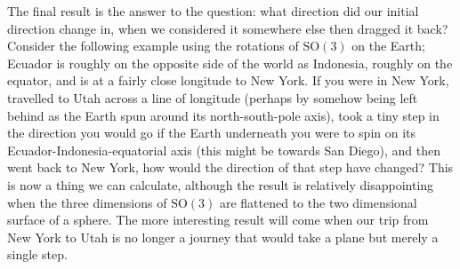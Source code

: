 \documentclass[11pt]{article}
\begin{document}
The final result is the answer to the question: what direction did our initial direction change in, when we considered it somewhere else then dragged it back? Consider the following example using the rotations of $\mathrm{SO(3)}$ on the Earth; Ecuador is roughly on the opposite side of the world as Indonesia, roughly on the equator, and is at a fairly close longitude to New York. If you were in New York, travelled to Utah across a line of longitude (perhaps by somehow being left behind as the Earth spun around its north-south-pole axis), took a tiny step in the direction you would go if the Earth underneath you were to spin on its Ecuador-Indonesia-equatorial axis (this might be towards San Diego), and then went back to New York, how would the direction of that step have changed? This is now a thing we can calculate, although the result is relatively disappointing when the three dimensions of $\mathrm{SO}(3)$ are flattened to the two dimensional surface of a sphere. The more interesting result will come when our trip from New York to Utah is no longer a journey that would take a plane but merely a single step.
\end{document}
